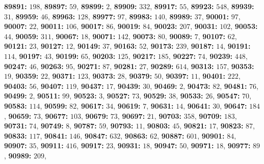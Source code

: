 \textsf{\bfseries 89891:} $198$, \textsf{\bfseries 89897:} $59$, \textsf{\bfseries 89899:} $2$, \textsf{\bfseries 89909:} $332$, \textsf{\bfseries 89917:} $55$, \textsf{\bfseries 89923:} $548$, \textsf{\bfseries 89939:} $31$, \textsf{\bfseries 89959:} $46$, \textsf{\bfseries 89963:} $128$, \textsf{\bfseries 89977:} $97$, \textsf{\bfseries 89983:} $140$, \textsf{\bfseries 89989:} $37$, \textsf{\bfseries 90001:} $97$, \textsf{\bfseries 90007:} $22$, \textsf{\bfseries 90011:} $106$, \textsf{\bfseries 90017:} $86$, \textsf{\bfseries 90019:} $84$, \textsf{\bfseries 90023:} $207$, \textsf{\bfseries 90031:} $102$, \textsf{\bfseries 90053:} $44$, \textsf{\bfseries 90059:} $311$, \textsf{\bfseries 90067:} $18$, \textsf{\bfseries 90071:} $142$, \textsf{\bfseries 90073:} $80$, \textsf{\bfseries 90089:} $7$, \textsf{\bfseries 90107:} $62$, \textsf{\bfseries 90121:} $23$, \textsf{\bfseries 90127:} $12$, \textsf{\bfseries 90149:} $37$, \textsf{\bfseries 90163:} $52$, \textsf{\bfseries 90173:} $239$, \textsf{\bfseries 90187:} $14$, \textsf{\bfseries 90191:} $114$, \textsf{\bfseries 90197:} $43$, \textsf{\bfseries 90199:} $65$, \textsf{\bfseries 90203:} $125$, \textsf{\bfseries 90217:} $185$, \textsf{\bfseries 90227:} $74$, \textsf{\bfseries 90239:} $448$, \textsf{\bfseries 90247:} $46$, \textsf{\bfseries 90263:} $95$, \textsf{\bfseries 90271:} $87$, \textsf{\bfseries 90281:} $27$, \textsf{\bfseries 90289:} $614$, \textsf{\bfseries 90313:} $157$, \textsf{\bfseries 90353:} $19$, \textsf{\bfseries 90359:} $22$, \textsf{\bfseries 90371:} $123$, \textsf{\bfseries 90373:} $28$, \textsf{\bfseries 90379:} $50$, \textsf{\bfseries 90397:} $11$, \textsf{\bfseries 90401:} $222$, \textsf{\bfseries 90403:} $56$, \textsf{\bfseries 90407:} $119$, \textsf{\bfseries 90437:} $17$, \textsf{\bfseries 90439:} $30$, \textsf{\bfseries 90469:} $2$, \textsf{\bfseries 90473:} $82$, \textsf{\bfseries 90481:} $76$, \textsf{\bfseries 90499:} $2$, \textsf{\bfseries 90511:} $99$, \textsf{\bfseries 90523:} $3$, \textsf{\bfseries 90527:} $73$, \textsf{\bfseries 90529:} $38$, \textsf{\bfseries 90533:} $26$, \textsf{\bfseries 90547:} $70$, \textsf{\bfseries 90583:} $114$, \textsf{\bfseries 90599:} $82$, \textsf{\bfseries 90617:} $34$, \textsf{\bfseries 90619:} $7$, \textsf{\bfseries 90631:} $14$, \textsf{\bfseries 90641:} $30$, \textsf{\bfseries 90647:} $184$, \textsf{\bfseries 90659:} $73$, \textsf{\bfseries 90677:} $103$, \textsf{\bfseries 90679:} $73$, \textsf{\bfseries 90697:} $21$, \textsf{\bfseries 90703:} $358$, \textsf{\bfseries 90709:} $183$, \textsf{\bfseries 90731:} $74$, \textsf{\bfseries 90749:} $8$, \textsf{\bfseries 90787:} $59$, \textsf{\bfseries 90793:} $11$, \textsf{\bfseries 90803:} $45$, \textsf{\bfseries 90821:} $17$, \textsf{\bfseries 90823:} $87$, \textsf{\bfseries 90833:} $117$, \textsf{\bfseries 90841:} $146$, \textsf{\bfseries 90847:} $632$, \textsf{\bfseries 90863:} $62$, \textsf{\bfseries 90887:} $601$, \textsf{\bfseries 90901:} $84$, \textsf{\bfseries 90907:} $35$, \textsf{\bfseries 90911:} $416$, \textsf{\bfseries 90917:} $23$, \textsf{\bfseries 90931:} $18$, \textsf{\bfseries 90947:} $50$, \textsf{\bfseries 90971:} $18$, \textsf{\bfseries 90977:} $89$, \textsf{\bfseries 90989:} $209$, 
